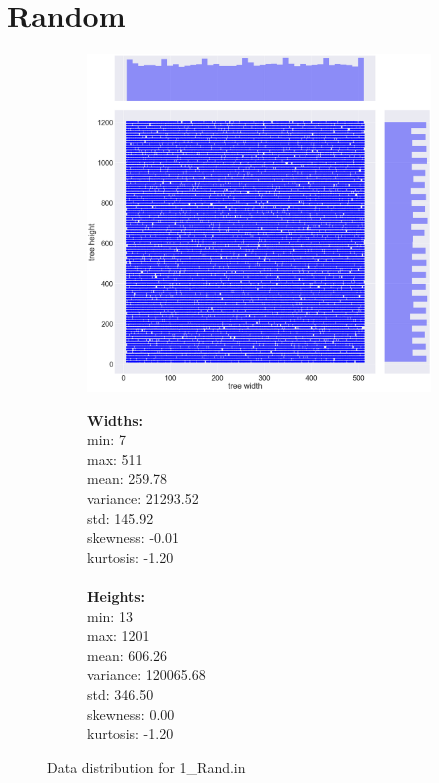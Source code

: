\section{Random}
\begin{figure}[H]
\centering
\begin{subfigure}{.8\textwidth}
	\includegraphics[width=.9\textwidth]{img/1_RAND_plot.png}
\end{subfigure}%
\begin{subfigure}{.2\textwidth}
  \centering
  \begin{minipage}{1\textwidth}
\textbf{Widths:}
\\
min: 7
\\
max: 511
\\
mean: 259.78
\\
variance: 21293.52
\\
std: 145.92
\\
skewness: -0.01
\\
kurtosis: -1.20
\\\\
\textbf{Heights:}
\\
min: 13
\\
max: 1201
\\
mean: 606.26
\\
variance: 120065.68
\\
std: 346.50
\\
skewness: 0.00
\\
kurtosis: -1.20
  \end{minipage}
\end{subfigure}
\caption{Data distribution for 1\_Rand.in}
\label{appendix:data:rand}
\end{figure}

